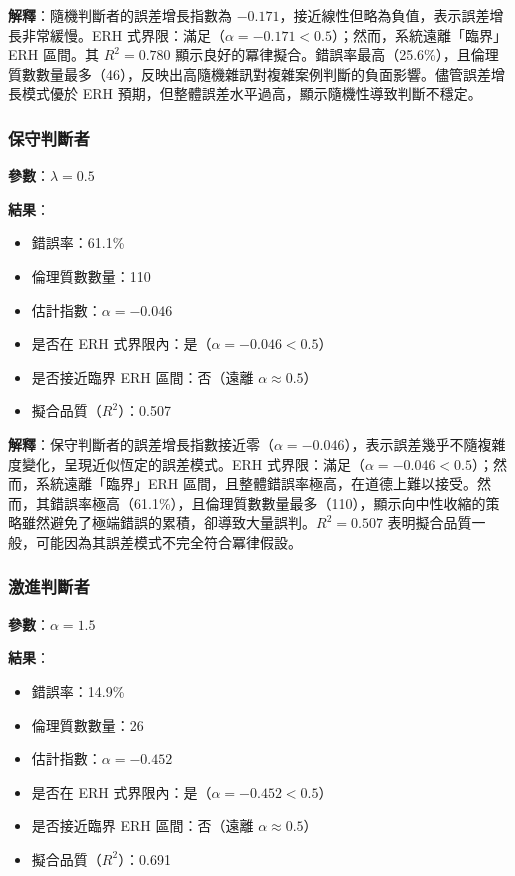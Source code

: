\documentclass[12pt,a4paper]{article}
\theoremstyle{definition}
\theoremstyle{remark}
\begin{document}
\textbf{解釋}：隨機判斷者的誤差增長指數為 $-0.171$，接近線性但略為負值，表示誤差增長非常緩慢。ERH 式界限：滿足（$\alpha = -0.171 < 0.5$）；然而，系統遠離「臨界」ERH 區間。其 $R^2 = 0.780$ 顯示良好的冪律擬合。錯誤率最高（25.6\%），且倫理質數數量最多（46），反映出高隨機雜訊對複雜案例判斷的負面影響。儘管誤差增長模式優於 ERH 預期，但整體誤差水平過高，顯示隨機性導致判斷不穩定。

\subsubsection{保守判斷者}

\textbf{參數}：$\lambda = 0.5$

\textbf{結果}：
\begin{itemize}
    \item 錯誤率：61.1\%
    \item 倫理質數數量：110
    \item 估計指數：$\alpha = -0.046$
    \item 是否在 ERH 式界限內：是（$\alpha = -0.046 < 0.5$）
    \item 是否接近臨界 ERH 區間：否（遠離 $\alpha \approx 0.5$）
    \item 擬合品質（$R^2$）：0.507
\end{itemize}

\textbf{解釋}：保守判斷者的誤差增長指數接近零（$\alpha = -0.046$），表示誤差幾乎不隨複雜度變化，呈現近似恆定的誤差模式。ERH 式界限：滿足（$\alpha = -0.046 < 0.5$）；然而，系統遠離「臨界」ERH 區間，且整體錯誤率極高，在道德上難以接受。然而，其錯誤率極高（61.1\%），且倫理質數數量最多（110），顯示向中性收縮的策略雖然避免了極端錯誤的累積，卻導致大量誤判。$R^2 = 0.507$ 表明擬合品質一般，可能因為其誤差模式不完全符合冪律假設。

\subsubsection{激進判斷者}

\textbf{參數}：$\alpha = 1.5$

\textbf{結果}：
\begin{itemize}
    \item 錯誤率：14.9\%
    \item 倫理質數數量：26
    \item 估計指數：$\alpha = -0.452$
    \item 是否在 ERH 式界限內：是（$\alpha = -0.452 < 0.5$）
    \item 是否接近臨界 ERH 區間：否（遠離 $\alpha \approx 0.5$）
    \item 擬合品質（$R^2$）：0.691
\end{itemize}
\end{document}
